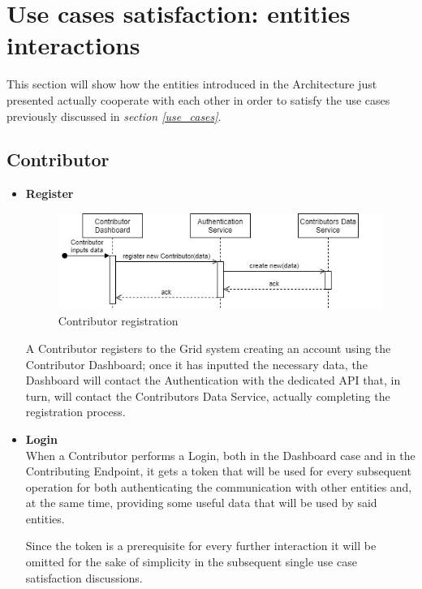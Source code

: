 \section{Use cases satisfaction: entities interactions}\label{use_cases_satisfaction}
This section will show how the entities introduced in the Architecture just presented actually cooperate with each other in order to satisfy the use cases previously discussed in \textit{section \ref{use_cases}}. 

\subsection{Contributor}
\begin{itemize}
    \item \textbf{Register}\\
    \begin{figure}[!ht]
        \centering
        \includegraphics[scale=1]{document/chapters/chapter_6/images/use_cases_satisfaction_contributor_register.jpg}
        \caption{Contributor registration}
        \label{fig:use_cases_satisfaction_contributor_register}
    \end{figure}

    A Contributor registers to the Grid system creating an account using the Contributor Dashboard; once it has inputted the necessary data, the Dashboard will contact the Authentication with the dedicated API that, in turn, will contact the Contributors Data Service, actually completing the registration process.

    \item \textbf{Login}\\
    When a Contributor performs a Login, both in the Dashboard case and in the Contributing Endpoint, it gets a token that will be used for every subsequent operation for both authenticating the communication with other entities and, at the same time, providing some useful data that will be used by said entities.
    
    Since the token is a prerequisite for every further interaction it will be omitted for the sake of simplicity in the subsequent single use case satisfaction discussions. 
     

\end{itemize}
